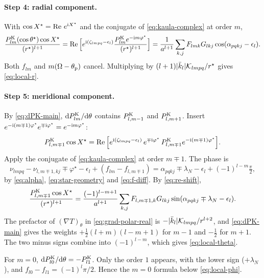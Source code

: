 \paragraph{Step 4: radial component.} With $\cos X^\star=\operatorname{Re}\,e^{\mathrm{i} X^\star}$ and the conjugate of \eqref{eq:kaula-complex} at order $m$,
\[
  \frac{P^{\mathrm K}_{lm}(\cos\theta^\star)\cos X^\star}{(r^\star)^{l+1}}=\operatorname{Re}\Big[e^{\mathrm{i}(\zeta_{lmpq}-\epsilon_l)}\frac{P^{\mathrm K}_{lm}e^{-\mathrm{i} m\varphi^\star}}{(r^\star)^{l+1}}\Big]=\frac{1}{a^{l+1}}\sum_{k,j}F_{lmk}G_{lkj}\cos(\alpha_{pqkj}-\epsilon_l).
\]
Both $f_{lm}$ and $m(\Omega-\theta_{\mathrm p})$ cancel. Multiplying by $(l+1)|\bar k_l|\mathcal K_{lmpq}/r^\star$ gives \eqref{eq:local-r}.

\paragraph{Step 5: meridional component.} By \eqref{eq:dPK-main}, $\mathrm{d}P^{\mathrm K}_{lm}/\mathrm{d}\theta$ contains $P^{\mathrm K}_{l,m-1}$ and $P^{\mathrm K}_{l,m+1}$. Insert $e^{-\mathrm{i}(m\mp1)\varphi^\star}e^{\mp\mathrm{i}\varphi^\star}=e^{-\mathrm{i} m\varphi^\star}$:
\[
  P^{\mathrm K}_{l,m\mp1}\cos X^\star=\operatorname{Re}\Big[e^{\mathrm{i}(\zeta_{lmpq}-\epsilon_l)}\,e^{\mp\mathrm{i}\varphi^\star}\,P^{\mathrm K}_{l,m\mp1}e^{-\mathrm{i}(m\mp1)\varphi^\star}\Big].
\]
Apply the conjugate of \eqref{eq:kaula-complex} at order $m\mp1$. The phase is
\[
  \nu_{lmpq}-\nu_{l,m\mp1,kj}\mp\varphi^\star-\epsilon_l+(f_{lm}-f_{l,m\mp1})=\alpha_{pqkj}\mp\lambda_N-\epsilon_l+(-1)^{l-m}\tfrac\pi2,
\]
by \eqref{eq:alpha}, \eqref{eq:star-geometry} and \eqref{eq:f-diff}. By \eqref{eq:re-shift},
\[
  \frac{P^{\mathrm K}_{l,m\mp1}\cos X^\star}{(r^\star)^{l+1}}=\frac{(-1)^{l-m+1}}{a^{l+1}}\sum_{k,j}F_{l,m\mp1,k}G_{lkj}\sin(\alpha_{pqkj}\mp\lambda_N-\epsilon_l).
\]
The prefactor of $(\nabla T)_\theta$ in \eqref{eq:grad-polar-real} is $-|\bar k_l|\mathcal K_{lmpq}/r^{l+2}$, and \eqref{eq:dPK-main} gives the weights $+\tfrac12(l+m)(l-m+1)$ for $m-1$ and $-\tfrac12$ for $m+1$. The two minus signs combine into $(-1)^{l-m}$, which gives \eqref{eq:local-theta}.

For $m=0$, $\mathrm{d}P^{\mathrm K}_{l0}/\mathrm{d}\theta=-P^{\mathrm K}_{l1}$. Only the order $1$ appears, with the lower sign ($+\lambda_N$), and $f_{l0}-f_{l1}=(-1)^l\pi/2$. Hence the $m=0$ formula below \eqref{eq:local-phi}.

